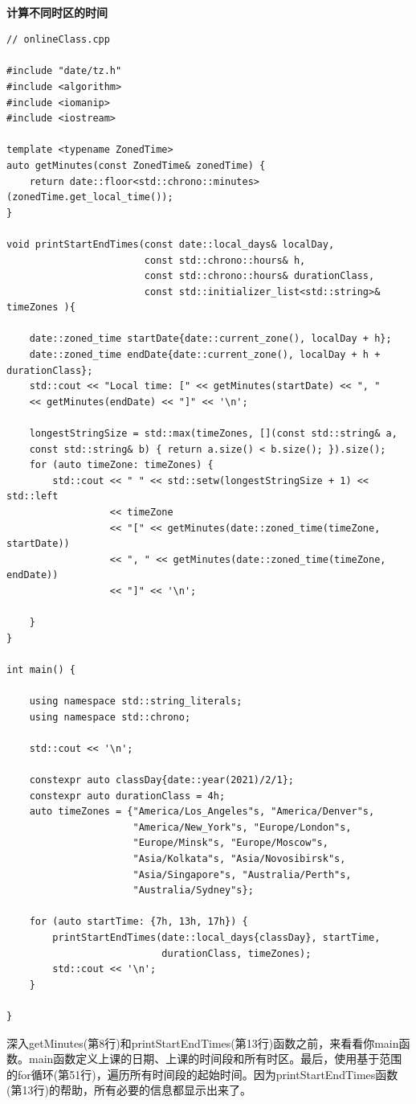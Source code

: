 \hspace*{\fill} \\ %
\noindent
\textbf{计算不同时区的时间}
\begin{lstlisting}[style=styleCXX]
// onlineClass.cpp

#include "date/tz.h"
#include <algorithm>
#include <iomanip>
#include <iostream>

template <typename ZonedTime>
auto getMinutes(const ZonedTime& zonedTime) {
	return date::floor<std::chrono::minutes>(zonedTime.get_local_time());
}

void printStartEndTimes(const date::local_days& localDay,
						const std::chrono::hours& h,
						const std::chrono::hours& durationClass,
						const std::initializer_list<std::string>& timeZones ){
	
	date::zoned_time startDate{date::current_zone(), localDay + h};
	date::zoned_time endDate{date::current_zone(), localDay + h + durationClass};
	std::cout << "Local time: [" << getMinutes(startDate) << ", "
	<< getMinutes(endDate) << "]" << '\n';
	
	longestStringSize = std::max(timeZones, [](const std::string& a,
	const std::string& b) { return a.size() < b.size(); }).size();
	for (auto timeZone: timeZones) {
		std::cout << " " << std::setw(longestStringSize + 1) << std::left
		          << timeZone
		          << "[" << getMinutes(date::zoned_time(timeZone, startDate))
		          << ", " << getMinutes(date::zoned_time(timeZone, endDate))
		          << "]" << '\n';
		
	}
}

int main() {

	using namespace std::string_literals;
	using namespace std::chrono;
	
	std::cout << '\n';
	
	constexpr auto classDay{date::year(2021)/2/1};
	constexpr auto durationClass = 4h;
	auto timeZones = {"America/Los_Angeles"s, "America/Denver"s,
					  "America/New_York"s, "Europe/London"s,
					  "Europe/Minsk"s, "Europe/Moscow"s,
					  "Asia/Kolkata"s, "Asia/Novosibirsk"s,
					  "Asia/Singapore"s, "Australia/Perth"s,
					  "Australia/Sydney"s};
	
	for (auto startTime: {7h, 13h, 17h}) {
		printStartEndTimes(date::local_days{classDay}, startTime,
						   durationClass, timeZones);
		std::cout << '\n';
	}

}
\end{lstlisting}

深入getMinutes(第8行)和printStartEndTimes(第13行)函数之前，来看看你main函数。main函数定义上课的日期、上课的时间段和所有时区。最后，使用基于范围的for循环(第51行)，遍历所有时间段的起始时间。因为printStartEndTimes函数(第13行)的帮助，所有必要的信息都显示出来了。

